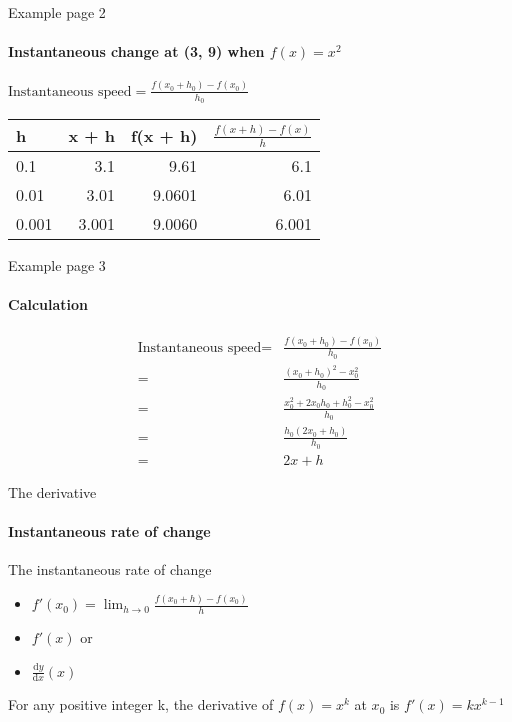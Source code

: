 \documentclass[14pt,xcolor=pdftex,dvipsnames,table]{beamer}
\begin{document}
\begin{frame}{Example page 2}
\framesubtitle{Instantaneous change at (3, 9) when $f(x) = x^2$}
$\text{Instantaneous speed} = \frac{f(x_0 + h_0) - f(x_0)}{h_0}$
\vskip 0.25cm
\begin{center}
\begin{tabular}{l r r r}
h & x + h & f(x + h) & $\frac{f(x +h) - f(x)}{h}$\\
\hline
0.1 & 3.1 & 9.61 & 6.1 \\
0.01 & 3.01 & 9.0601 & 6.01 \\
0.001 & 3.001 & 9.0060 & 6.001\\
\end{tabular}
\end{center}
\end{frame}

\begin{frame}{Example page 3}
\framesubtitle{Calculation}
\begin{align*}
\text{Instantaneous speed} = &\frac{f(x_0 + h_0) - f(x_0)}{h_0}\\
 = & \frac{(x_0 + h_0)^2 - x_0^2}{h_0}\\
 = & \frac{x_0^2 +2x_0h_0 + h_0^2 - x_0^2}{h_0}\\
 = & \frac{h_0(2x_0 + h_0)}{h_0}\\
 = & 2x + h
 \end{align*}
 \end{frame}
 
 \begin{frame}{The derivative}
 \framesubtitle{Instantaneous rate of change}
 The instantaneous rate of change 
 \pause
  \begin{itemize}[<+-| alert@+>]
 \item $f'(x_0) = \lim_{h \to 0} \frac{f(x_0 +h) - f(x_0)}{h}$
 \item $f'(x)$
 or
 \item $\frac{\mathrm d y}{\mathrm d x}(x)$
 \end{itemize}
 \pause
 \begin{block}{}
For any positive integer k, the derivative of $f(x) = x^k$ at $x_0$ is $f'(x) = kx^{k-1}$
\end{block}
\end{frame}

\end{document}
